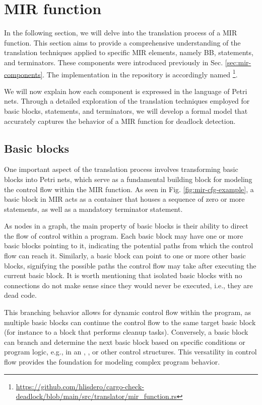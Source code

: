 \section{MIR function}

In the following section,
we will delve into the translation process of a \acrshort{MIR} function.
This section aims to provide a comprehensive understanding
of the translation techniques applied to specific MIR elements,
namely \acrfull{BB}, statements, and terminators.
These components were introduced previously in Sec. \ref{sec:mir-components}.
The implementation in the repository is accordingly named
\footnote{\url{https://github.com/hlisdero/cargo-check-deadlock/blob/main/src/translator/mir_function.rs}}.

We will now explain how each component is expressed in the language of Petri nets.
Through a detailed exploration of the translation techniques employed for
basic blocks, statements, and terminators, we will develop a formal model that
accurately captures the behavior of a \acrshort{MIR} function for deadlock detection.

\subsection{Basic blocks}

One important aspect of the translation process involves transforming basic blocks into Petri nets,
which serve as a fundamental building block for modeling the control flow within the MIR function.
As seen in Fig. \ref{fig:mir-cfg-example}, a basic block in \acrshort{MIR} acts as a container
that houses a sequence of zero or more statements, as well as a mandatory terminator statement.

As nodes in a graph, the main property of basic blocks is
their ability to direct the flow of control within a program.
Each basic block may have one or more basic blocks pointing to it,
indicating the potential paths from which the control flow can reach it.
Similarly, a basic block can point to one or more other basic blocks,
signifying the possible paths the control flow may take after executing the current basic block.
It is worth mentioning that isolated basic blocks with no connections
do not make sense since they would never be executed, i.e., they are dead code.

This branching behavior allows for dynamic control flow within the program,
as multiple basic blocks can continue the control flow to the same target basic block
(for instance to a block that performs cleanup tasks).
Conversely, a basic block can branch and
determine the next basic block based on specific conditions or program logic, e.g.,
in an , ,  or other control structures.
This versatility in control flow provides the foundation for modeling complex program behavior.

